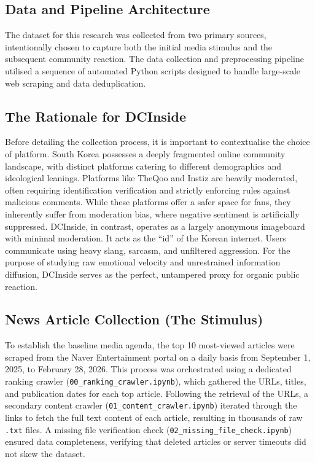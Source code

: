 \documentclass[9pt,twoside,lineno]{pnas-new}
\begin{document}
\begin{article}
\section*{Data and Pipeline Architecture}
The dataset for this research was collected from two primary sources, intentionally chosen to capture both the initial media stimulus and the subsequent community reaction. The data collection and preprocessing pipeline utilised a sequence of automated Python scripts designed to handle large-scale web scraping and data deduplication.

\subsection*{The Rationale for DCInside}
Before detailing the collection process, it is important to contextualise the choice of platform. South Korea possesses a deeply fragmented online community landscape, with distinct platforms catering to different demographics and ideological leanings. Platforms like TheQoo and Instiz are heavily moderated, often requiring identification verification and strictly enforcing rules against malicious comments. While these platforms offer a safer space for fans, they inherently suffer from moderation bias, where negative sentiment is artificially suppressed. DCInside, in contrast, operates as a largely anonymous imageboard with minimal moderation. It acts as the ``id'' of the Korean internet. Users communicate using heavy slang, sarcasm, and unfiltered aggression. For the purpose of studying raw emotional velocity and unrestrained information diffusion, DCInside serves as the perfect, untampered proxy for organic public reaction.

\subsection*{News Article Collection (The Stimulus)}
To establish the baseline media agenda, the top 10 most-viewed articles were scraped from the Naver Entertainment portal on a daily basis from September 1, 2025, to February 28, 2026. This process was orchestrated using a dedicated ranking crawler (\texttt{00\_ranking\_crawler.ipynb}), which gathered the URLs, titles, and publication dates for each top article. Following the retrieval of the URLs, a secondary content crawler (\texttt{01\_content\_crawler.ipynb}) iterated through the links to fetch the full text content of each article, resulting in thousands of raw \texttt{.txt} files. A missing file verification check (\texttt{02\_missing\_file\_check.ipynb}) ensured data completeness, verifying that deleted articles or server timeouts did not skew the dataset.


\end{article}
\end{document}
